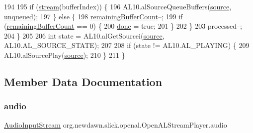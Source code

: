 \begin{DoxyCode}
194             
195             \textcolor{keywordflow}{if} (\mbox{\hyperlink{classorg_1_1newdawn_1_1slick_1_1openal_1_1_open_a_l_stream_player_a2facc6d1dcd937dbdc5dadcbb81929ed}{stream}}(bufferIndex)) \{            
196                 AL10.alSourceQueueBuffers(\mbox{\hyperlink{classorg_1_1newdawn_1_1slick_1_1openal_1_1_open_a_l_stream_player_abe9f7d1ac52a705aa359cf3eb1c69464}{source}}, \mbox{\hyperlink{classorg_1_1newdawn_1_1slick_1_1openal_1_1_open_a_l_stream_player_a57522a0a0a5ef27a24b13672a7637174}{unqueued}});
197             \} \textcolor{keywordflow}{else} \{
198                 \mbox{\hyperlink{classorg_1_1newdawn_1_1slick_1_1openal_1_1_open_a_l_stream_player_a071d3388ce422c839a62047c0a966315}{remainingBufferCount}}--;
199                 \textcolor{keywordflow}{if} (\mbox{\hyperlink{classorg_1_1newdawn_1_1slick_1_1openal_1_1_open_a_l_stream_player_a071d3388ce422c839a62047c0a966315}{remainingBufferCount}} == 0) \{
200                     \mbox{\hyperlink{classorg_1_1newdawn_1_1slick_1_1openal_1_1_open_a_l_stream_player_a64962f56b4c366c19fe3c2bff2f55842}{done}} = \textcolor{keyword}{true};
201                 \}
202             \}
203             processed--;
204         \}
205         
206         \textcolor{keywordtype}{int} state = AL10.alGetSourcei(\mbox{\hyperlink{classorg_1_1newdawn_1_1slick_1_1openal_1_1_open_a_l_stream_player_abe9f7d1ac52a705aa359cf3eb1c69464}{source}}, AL10.AL\_SOURCE\_STATE);
207         
208         \textcolor{keywordflow}{if} (state != AL10.AL\_PLAYING) \{
209             AL10.alSourcePlay(\mbox{\hyperlink{classorg_1_1newdawn_1_1slick_1_1openal_1_1_open_a_l_stream_player_abe9f7d1ac52a705aa359cf3eb1c69464}{source}});
210         \}
211     \}
\end{DoxyCode}


\subsection{Member Data Documentation}
\mbox{\label{classorg_1_1newdawn_1_1slick_1_1openal_1_1_open_a_l_stream_player_a694870dca2079ff6e6269a394a126d17}} 
\subsubsection{\texorpdfstring{audio}{audio}}
{\footnotesize\ttfamily \mbox{\hyperlink{interfaceorg_1_1newdawn_1_1slick_1_1openal_1_1_audio_input_stream}{Audio\+Input\+Stream}} org.\+newdawn.\+slick.\+openal.\+Open\+A\+L\+Stream\+Player.\+audio\hspace{0.3cm}{\ttfamily [private]}}

